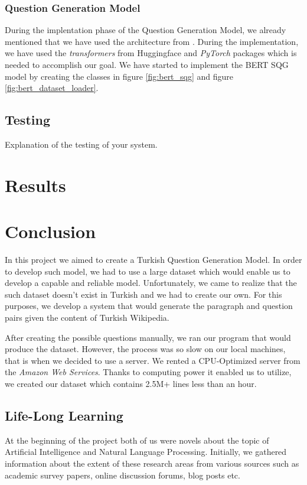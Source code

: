 \documentclass{mefsdp}
\begin{document}
	\subsubsection{Question Generation Model}
	During the implentation phase of the Question Generation Model, we already mentioned that we have used the architecture from \cite{chan-fan-2019-recurrent}. During the implementation, we have used the \textit{transformers} from Huggingface and \textit{PyTorch} packages which is needed to accomplish our goal.  We have started to implement the BERT SQG model by creating the classes in figure \ref{fig:bert_sqg} and figure \ref{fig:bert_dataset_loader}. 
	\subsection{Testing}
	Explanation of the testing of your system.
	
	\section{Results}
	
	
	\section{Conclusion}
	In this project we aimed to create a Turkish Question Generation Model. In order to develop such model, we had to use a large dataset which would enable us to develop a capable and reliable model. Unfortunately, we came to realize that the such dataset doesn't exist in Turkish and we had to create our own. For this purposes, we develop a system that would generate the paragraph and question pairs given the content of Turkish Wikipedia. \newline \par
	
	After creating the possible questions manually, we ran our program that would produce the dataset. However, the process was so slow on our local machines, that is when we decided to use a server. We rented a CPU-Optimized server from the \textit{Amazon Web Services}. Thanks to computing power it enabled us to utilize, we created our dataset which contains 2.5M+ lines less than an hour. \newline \par
 
	
	\subsection{Life-Long Learning}
	At the beginning of the project both of us were novels about the topic of Artificial Intelligence and Natural Language Processing. Initially, we gathered information about the extent of these research areas from various sources such as academic survey papers, online discussion forums, blog posts etc. \newline \par
	
\end{document}
